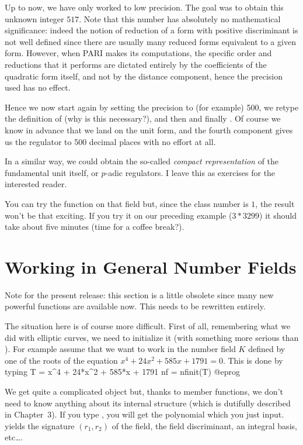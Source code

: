 Up to now, we have only worked to low precision. The goal was to obtain this
unknown integer $517$. Note that this number has absolutely no mathematical
significance: indeed the notion of reduction of a form with positive
discriminant is not well defined since there are usually many reduced forms
equivalent to a given form. However, when PARI makes its computations, the
specific order and reductions that it performs are dictated entirely by the
coefficients of the quadratic form itself, and not by the distance component,
hence the precision used has no effect.

Hence we now start again by setting the precision to (for example) 500,
we retype the definition of  (why is this necessary?), and then
 and finally . Of course we know in
advance that we land on the unit form, and the fourth component gives us the
regulator to 500 decimal places with no effort at all.

In a similar way, we could obtain the so-called {\it compact representation}
of the fundamental unit itself, or $p$-adic regulators. I leave this as
exercises for the interested reader.

You can try the  function on that field but, since the class
number is $1$, the result won't be that exciting. If you try it on our
preceding example ($3*3299$) it should take about five minutes (time for a
coffee break?).

\section{Working in General Number Fields}

Note for the present release: this section is a little obsolete since many
new powerful functions are available now. This needs to be rewritten
entirely. \smallskip

The situation here is of course more difficult. First of all, remembering
what we did with elliptic curves, we need to initialize it (with something
more serious than ). For example assume that we want to work in
the number field $K$ defined by one of the roots of the equation
$x^4+24x^2+585x+1791=0$. This is done by typing
\bprog
T = x^4 + 24*x^2 + 585*x + 1791
nf = nfinit(T)
@eprog

We get quite a complicated object but, thanks to member functions, we don't
need to know anything about its internal structure (which is dutifully
described in Chapter~3). If you type , you will get the
polynomial  which you just input.  yields the signature
$(r_1,r_2)$ of the field,  the field discriminant, 
an integral basis, etc\dots.

